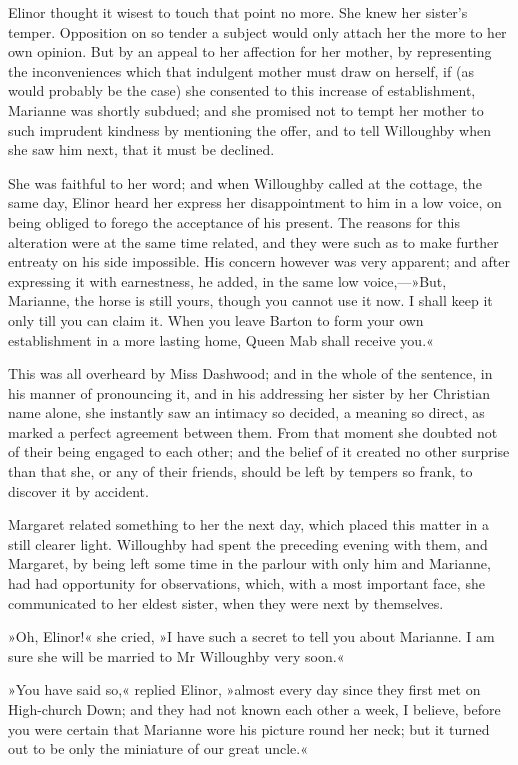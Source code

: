 Elinor thought it wisest to touch that point no more. She knew her sister’s temper. Opposition on so tender a subject would only attach her the more to her own opinion. But by an appeal to her affection for her mother, by representing the inconveniences which that indulgent mother must draw on herself, if (as would probably be the case) she consented to this increase of establishment, Marianne was shortly subdued; and she promised not to tempt her mother to such imprudent kindness by mentioning the offer, and to tell Willoughby when she saw him next, that it must be declined.

She was faithful to her word; and when Willoughby called at the cottage, the same day, Elinor heard her express her disappointment to him in a low voice, on being obliged to forego the acceptance of his present. The reasons for this alteration were at the same time related, and they were such as to make further entreaty on his side impossible. His concern however was very apparent; and after expressing it with earnestness, he added, in the same low voice,—»But, Marianne, the horse is still yours, though you cannot use it now. I shall keep it only till you can claim it. When you leave Barton to form your own establishment in a more lasting home, Queen Mab shall receive you.«

This was all overheard by Miss Dashwood; and in the whole of the sentence, in his manner of pronouncing it, and in his addressing her sister by her Christian name alone, she instantly saw an intimacy so decided, a meaning so direct, as marked a perfect agreement between them. From that moment she doubted not of their being engaged to each other; and the belief of it created no other surprise than that she, or any of their friends, should be left by tempers so frank, to discover it by accident.

Margaret related something to her the next day, which placed this matter in a still clearer light. Willoughby had spent the preceding evening with them, and Margaret, by being left some time in the parlour with only him and Marianne, had had opportunity for observations, which, with a most important face, she communicated to her eldest sister, when they were next by themselves.

»Oh, Elinor!« she cried, »I have such a secret to tell you about Marianne. I am sure she will be married to Mr Willoughby very soon.«

»You have said so,« replied Elinor, »almost every day since they first met on High-church Down; and they had not known each other a week, I believe, before you were certain that Marianne wore his picture round her neck; but it turned out to be only the miniature of our great uncle.«

